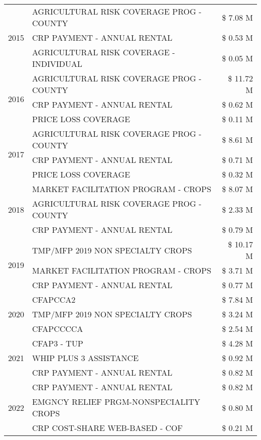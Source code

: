 \begin{tabular}{llr}
\cline{1-3}
\multirow[t]{3}{*}{2015} & AGRICULTURAL RISK COVERAGE PROG - COUNTY & \$ 7.08 M \\
 & CRP PAYMENT - ANNUAL RENTAL & \$ 0.53 M \\
 & AGRICULTURAL RISK COVERAGE - INDIVIDUAL & \$ 0.05 M \\
\cline{1-3}
\multirow[t]{3}{*}{2016} & AGRICULTURAL RISK COVERAGE PROG - COUNTY & \$ 11.72 M \\
 & CRP PAYMENT - ANNUAL RENTAL & \$ 0.62 M \\
 & PRICE LOSS COVERAGE & \$ 0.11 M \\
\cline{1-3}
\multirow[t]{3}{*}{2017} & AGRICULTURAL RISK COVERAGE PROG - COUNTY & \$ 8.61 M \\
 & CRP PAYMENT - ANNUAL RENTAL & \$ 0.71 M \\
 & PRICE LOSS COVERAGE & \$ 0.32 M \\
\cline{1-3}
\multirow[t]{3}{*}{2018} & MARKET FACILITATION PROGRAM - CROPS & \$ 8.07 M \\
 & AGRICULTURAL RISK COVERAGE PROG - COUNTY & \$ 2.33 M \\
 & CRP PAYMENT - ANNUAL RENTAL & \$ 0.79 M \\
\cline{1-3}
\multirow[t]{3}{*}{2019} & TMP/MFP 2019 NON SPECIALTY CROPS & \$ 10.17 M \\
 & MARKET FACILITATION PROGRAM - CROPS & \$ 3.71 M \\
 & CRP PAYMENT - ANNUAL RENTAL & \$ 0.77 M \\
\cline{1-3}
\multirow[t]{3}{*}{2020} & CFAPCCA2 & \$ 7.84 M \\
 & TMP/MFP 2019 NON SPECIALTY CROPS & \$ 3.24 M \\
 & CFAPCCCCA & \$ 2.54 M \\
\cline{1-3}
\multirow[t]{3}{*}{2021} & CFAP3 - TUP & \$ 4.28 M \\
 & WHIP PLUS 3 ASSISTANCE & \$ 0.92 M \\
 & CRP PAYMENT - ANNUAL RENTAL & \$ 0.82 M \\
\cline{1-3}
\multirow[t]{3}{*}{2022} & CRP PAYMENT - ANNUAL RENTAL & \$ 0.82 M \\
 & EMGNCY RELIEF PRGM-NONSPECIALITY CROPS & \$ 0.80 M \\
 & CRP COST-SHARE WEB-BASED - COF & \$ 0.21 M \\
\cline{1-3}
\bottomrule
\end{tabular}
